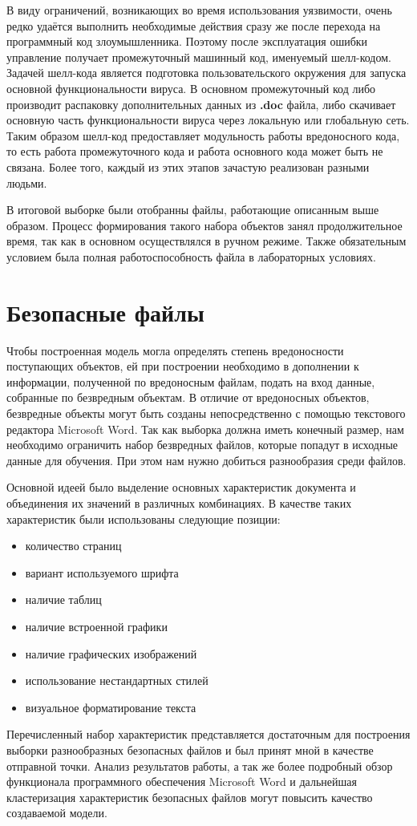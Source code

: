 В виду ограничений, возникающих во время использования уязвимости, очень редко удаётся выполнить необходимые действия сразу же после перехода на программный код злоумышленника.
Поэтому после эксплуатация ошибки управление получает промежуточный машинный код, именуемый шелл-кодом.
Задачей шелл-кода является подготовка пользовательского окружения для запуска основной функциональности вируса.
В основном промежуточный код либо производит распаковку дополнительных данных из \textbf{.doc} файла, либо скачивает основную часть функциональности вируса через локальную или глобальную сеть.
Таким образом шелл-код предоставляет модульность работы вредоносного кода, то есть работа промежуточного кода и работа основного кода может быть не связана.
Более того, каждый из этих этапов зачастую реализован разными людьми.

В итоговой выборке были отобранны файлы, работающие описанным выше образом.
Процесс формирования такого набора объектов занял продолжительное время, так как в основном осуществлялся в ручном режиме.
Также обязательным условием была полная работоспособность файла в лабораторных условиях.

\section{Безопасные файлы}

Чтобы построенная модель могла определять степень вредоносности поступающих объектов, ей при построении необходимо в дополнении к информации, полученной по вредоносным файлам, подать на вход данные, собранные по безвредным объектам.
В отличие от вредоносных объектов, безвредные объекты могут быть созданы непосредственно с помощью текстового редактора Microsoft Word.
Так как выборка должна иметь конечный размер, нам необходимо ограничить набор безвредных файлов, которые попадут в исходные данные для обучения.
При этом нам нужно добиться разнообразия среди файлов.

Основной идеей было выделение основных характеристик документа и объединения их значений в различных комбинациях.
В качестве таких характеристик были использованы следующие позиции:
\begin{itemize}
\item количество страниц
\item вариант используемого шрифта
\item наличие таблиц
\item наличие встроенной графики
\item наличие графических изображений
\item использование нестандартных стилей
\item визуальное форматирование текста
\end{itemize}

Перечисленный набор характеристик представляется достаточным для построения выборки разнообразных безопасных файлов и был принят мной в качестве отправной точки.
Анализ результатов работы, а так же более подробный обзор функционала программного обеспечения Microsoft Word и дальнейшая кластеризация характеристик безопасных файлов могут повысить качество создаваемой модели.